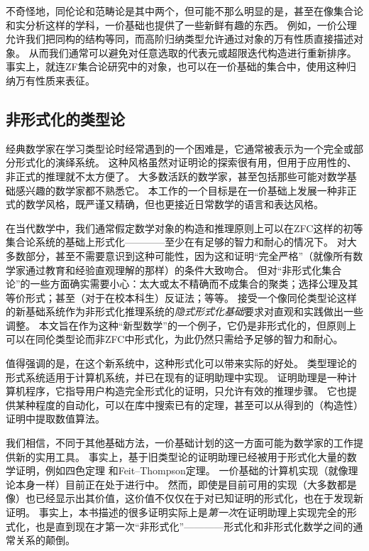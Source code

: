 不奇怪地，同伦论和范畴论是其中两个，但可能不那么明显的是，甚至在像集合论和实分析这样的学科，一价基础也提供了一些新鲜有趣的东西。
例如，一价公理允许我们把同构的结构等同，而高阶归纳类型允许通过对象的万有性质直接描述对象。
从而我们通常可以避免对任意选取的代表元或超限迭代构造进行重新排序。
事实上，就连ZF集合论研究中的对象，也可以在一价基础的集合中，使用这种归纳万有性质来表征。

%


\subsection*{非形式化的类型论}

%
%
%
%
经典数学家在学习类型论时经常遇到的一个困难是，它通常被表示为一个完全或部分形式化的演绎系统。
这种风格虽然对证明论的探索很有用，但用于应用性的、非正式的推理就不太方便了。
大多数活跃的数学家，甚至包括那些可能对数学基础感兴趣的数学家都不熟悉它。
本工作的一个目标是在一价基础上发展一种非正式的数学风格，既严谨又精确，但也更接近日常数学的语言和表达风格。

在当代数学中，我们通常假定数学对象的构造和推理原则上可以在ZFC这样的初等集合论系统的基础上形式化————至少在有足够的智力和耐心的情况下。
对大多数部分，甚至不需要意识到这种可能性，因为这和证明“完全严格”（就像所有数学家通过教育和经验直观理解的那样）的条件大致吻合。
但对“非形式化集合论”的一些方面确实需要小心：太大或太不精确而不成集合的聚类；选择公理及其等价形式；甚至（对于在校本科生）反证法；等等。
接受一个像同伦类型论这样的新基础系统作为非形式化推理系统的\emph{隐式形式化基础}要求对直观和实践做出一些调整。
本文旨在作为这种“新型数学”的一个例子，它仍是非形式化的，但原则上可以在同伦类型论而非ZFC中形式化，为此仍然只需给予足够的智力和耐心。

值得强调的是，在这个新系统中，这种形式化可以带来实际的好处。
类型理论的形式系统适用于计算机系统，并已在现有的证明助理中实现。
%
证明助理是一种计算机程序，它指导用户构造完全形式化的证明，只允许有效的推理步骤。
它也提供某种程度的自动化，可以在库中搜索已有的定理，甚至可以从得到的（构造性）证明中提取数值算法。

我们相信，不同于其他基础方法，一价基础计划的这一方面可能为数学家的工作提供新的实用工具。
事实上，基于旧类型论的证明助理已经被用于形式化大量的数学证明，例如四色定理 和Feit--Thompson定理。
一价基础的计算机实现（就像理论本身一样）目前正在处于进行中。
%
然而，即使是目前可用的实现（大多数都是像）也已经显示出其价值，这价值不仅仅在于对已知证明的形式化，也在于发现新证明。
事实上，本书描述的很多证明实际上是\emph{第一次}在证明助理上实现完全的形式化，也是直到现在才第一次“非形式化”————形式化和非形式化数学之间的通常关系的颠倒。

